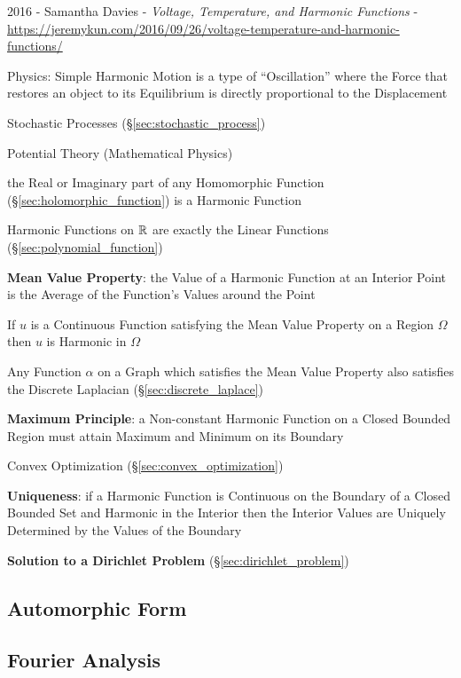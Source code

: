2016 - Samantha Davies - \emph{Voltage, Temperature, and Harmonic
  Functions} -
\url{https://jeremykun.com/2016/09/26/voltage-temperature-and-harmonic-functions/}

Physics: Simple Harmonic Motion is a type of ``Oscillation'' where the
Force that restores an object to its Equilibrium is directly
proportional to the Displacement

Stochastic Processes (\S\ref{sec:stochastic_process})

Potential Theory (Mathematical Physics) %

the Real or Imaginary part of any Homomorphic Function
(\S\ref{sec:holomorphic_function}) is a Harmonic Function

Harmonic Functions on $\mathbb{R}$ are exactly the Linear Functions
(\S\ref{sec:polynomial_function})


\textbf{Mean Value Property}: the Value of a Harmonic Function at an
Interior Point is the Average of the Function's Values around the
Point

If $u$ is a Continuous Function satisfying the Mean Value Property on
a Region $\Omega$ then $u$ is Harmonic in $\Omega$

Any Function $\alpha$ on a Graph which satisfies the Mean Value
Property also satisfies the Discrete Laplacian
(\S\ref{sec:discrete_laplace})


\textbf{Maximum Principle}: a Non-constant Harmonic Function on a
Closed Bounded Region must attain Maximum and Minimum on its Boundary

Convex Optimization (\S\ref{sec:convex_optimization})


\textbf{Uniqueness}: if a Harmonic Function is Continuous on the
Boundary of a Closed Bounded Set and Harmonic in the Interior then the
Interior Values are Uniquely Determined by the Values of the Boundary


\textbf{Solution to a Dirichlet Problem}
(\S\ref{sec:dirichlet_problem})



\subsection{Automorphic Form}\label{sec:automorphic_form}

\subsection{Fourier Analysis}\label{sec:fourier_analysis}

